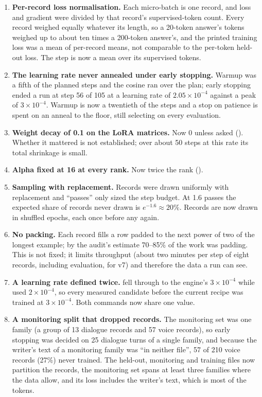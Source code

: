 \begin{enumerate}
\item \textbf{Per-record loss normalisation.} Each micro-batch is one record, and loss and
  gradient were divided by that record's supervised-token count. Every record weighed equally
  whatever its length, so a 20-token answer's tokens weighed up to about ten times a 200-token
  answer's, and the printed training loss was a mean of per-record means, not comparable to
  the per-token held-out loss. The step is now a mean over its supervised tokens.
\item \textbf{The learning rate never annealed under early stopping.} Warmup was a fifth of
  the planned steps and the cosine ran over the plan; early stopping ended a run at step 56 of
  105 at a learning rate of $2.05\times10^{-4}$ against a peak of $3\times10^{-4}$.
  Warmup is now a twentieth of the steps and a stop on patience is spent on an anneal to the
  floor, still selecting on every evaluation.
\item \textbf{Weight decay of 0.1 on the LoRA matrices.} Now 0 unless asked
  (). Whether it mattered is not established; over about 50 steps at
  this rate its total shrinkage is small.
\item \textbf{Alpha fixed at 16 at every rank.} Now twice the rank ().
\item \textbf{Sampling with replacement.} Records were drawn uniformly with replacement and
  ``passes'' only sized the step budget. At 1.6 passes the expected share of records never drawn
  is $e^{-1.6}\approx20\%$. Records are now drawn in shuffled epochs, each once before any again.
\item \textbf{No packing.} Each record fills a row padded to the next power of two of the
  longest example; by the audit's estimate 70--85\% of the work was padding. This is not
  fixed; it limits throughput (about two minutes per step of eight records, including
  evaluation, for v7) and therefore the data a run can see.
\item \textbf{A learning rate defined twice.}  fell through to the engine's
  $3\times10^{-4}$ while  used $2\times10^{-4}$, so every measured candidate
  before the current recipe was trained at $3\times10^{-4}$. Both commands now share one value.
\item \textbf{A monitoring split that dropped records.} The monitoring set was one family (a
  group of 13 dialogue records and 57 voice records), so early stopping was decided on 25
  dialogue turns of a single family, and because the writer's text of a monitoring family
  was ``in neither file'', 57 of 210 voice records (27\%) never trained. The held-out,
  monitoring and training files now partition the records, the monitoring set spans at least
  three families where the data allow, and its loss includes the writer's text, which is most
  of the tokens.
\end{enumerate}

